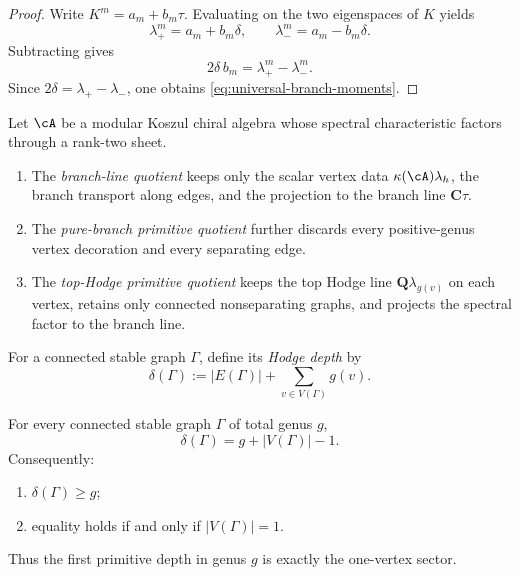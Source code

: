 \begin{proof}
Write \(K^m=a_m+b_m\tau\). Evaluating on the two eigenspaces of
\(K\) yields
\[
\lambda_+^m=a_m+b_m\delta,
\qquad
\lambda_-^m=a_m-b_m\delta.
\]
Subtracting gives
\[
2\delta\,b_m=\lambda_+^m-\lambda_-^m.
\]
Since \(2\delta=\lambda_+-\lambda_-\), one obtains
\eqref{eq:universal-branch-moments}.
\end{proof}

\begin{definition}
\label{def:branch-line-primitive-quotients}
Let \(\cA\) be a modular Koszul chiral algebra whose spectral
characteristic factors through a rank-two sheet.
\begin{enumerate}[label=\textup{(\roman*)}]
\item The \emph{branch-line quotient} keeps only the scalar vertex data
 \(\kappa(\cA)\lambda_h\), the branch transport along edges, and the
 projection to the branch line \(\mathbf C\tau\).
\item The \emph{pure-branch primitive quotient} further discards every
 positive-genus vertex decoration and every separating edge.
\item The \emph{top-Hodge primitive quotient} keeps the top Hodge line
 \(\mathbf Q\lambda_{g(v)}\) on each vertex, retains only connected
 nonseparating graphs, and projects the spectral factor to the branch
 line.
\end{enumerate}
\end{definition}

\begin{definition}
\label{def:hodge-depth}
For a connected stable graph \(\Gamma\), define its
\emph{Hodge depth} by
\begin{equation}
\label{eq:hodge-depth}
\delta(\Gamma):=|E(\Gamma)|+\sum_{v\in V(\Gamma)}g(v).
\end{equation}
\end{definition}

\begin{theorem}
\label{thm:hodge-depth-formula}
For every connected stable graph \(\Gamma\) of total genus \(g\),
\begin{equation}
\label{eq:depth-formula}
\delta(\Gamma)=g+|V(\Gamma)|-1.
\end{equation}
Consequently:
\begin{enumerate}[label=\textup{(\roman*)}]
\item \(\delta(\Gamma)\geq g\);
\item equality holds if and only if \(|V(\Gamma)|=1\).
\end{enumerate}
Thus the first primitive depth in genus \(g\) is exactly the one-vertex
sector.
\end{theorem}

